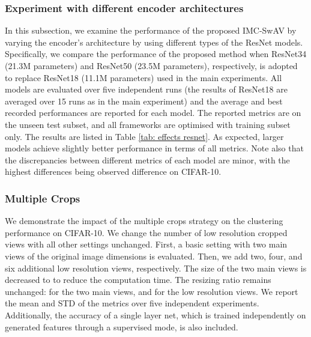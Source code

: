 \documentclass[journal]{IEEEtran}
\begin{document}
\subsubsection{Experiment with different encoder architectures}  
In this subsection, we examine the performance of the proposed IMC-SwAV by varying the encoder's architecture by using different types of the ResNet \cite{he2015deep} models. Specifically, we compare the performance of the proposed method when ResNet34 (21.3M parameters) and ResNet50 (23.5M parameters), respectively, is adopted to replace  ResNet18 (11.1M parameters) used in the main experiments. All models are evaluated over five independent runs (the results of ResNet18 are averaged over 15 runs as in the main experiment) and the average and best recorded performances are reported for each model. The reported metrics are on the unseen test subset, and all frameworks are optimised with training subset only. The results are listed in Table \ref{tab: effects resnet}. As expected, larger models achieve slightly better performance in terms of all metrics. Note also that the discrepancies between different metrics of each model are minor, with the highest differences being observed difference on CIFAR-10. 


\subsubsection{Multiple Crops} 
We demonstrate the impact of the multiple crops strategy on the clustering performance on CIFAR-10. We change the number of low resolution cropped views with all other settings unchanged. First, a basic setting with two main views of the original image dimensions is evaluated. Then, we add two, four, and six additional low resolution views, respectively. The size of the two main views is decreased to  to reduce the computation time. The resizing ratio remains unchanged:  for the two main views, and  for the low resolution views. We report the mean and STD of the metrics over five independent experiments. Additionally, the accuracy of a single layer net, which is trained independently on generated features through a supervised mode, is also included. \par
\end{document}
